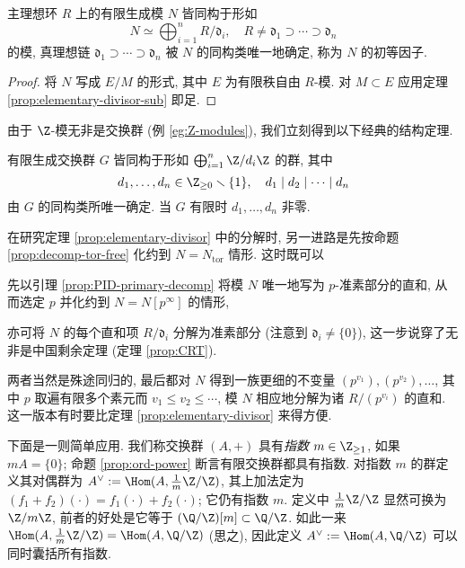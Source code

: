 \begin{theorem}\label{prop:elementary-divisor}
	主理想环 $R$ 上的有限生成模 $N$ 皆同构于形如
	\[ N \simeq \bigoplus_{i=1}^n R/\mathfrak{d}_i, \quad R \neq \mathfrak{d}_1 \supset \cdots \supset \mathfrak{d}_n \]
	的模, 真理想链 $\mathfrak{d}_1 \supset \cdots \supset \mathfrak{d}_n$ 被 $N$ 的同构类唯一地确定, 称为 $N$ 的初等因子.
\end{theorem}
\begin{proof}
	将 $N$ 写成 $E/M$ 的形式, 其中 $E$ 为有限秩自由 $R$-模. 对 $M \subset E$ 应用定理 \ref{prop:elementary-divisor-sub} 即足.
\end{proof}

由于 $\Z$-模无非是交换群 (例 \ref{eg:Z-modules}), 我们立刻得到以下经典的结构定理.
\begin{corollary}\label{prop:finite-abelian-structure}
	有限生成交换群 $G$ 皆同构于形如 $\bigoplus_{i=1}^n \Z/d_i\Z$ 的群, 其中
	\[ d_1, \ldots, d_n \in \Z_{\geq 0} \smallsetminus \{1\}, \quad d_1 \mid  d_2  \mid  \cdots  \mid  d_n \]
	由 $G$ 的同构类所唯一确定. 当 $G$ 有限时 $d_1, \ldots, d_n$ 非零.
\end{corollary}

\begin{remark}\label{rem:primary-elementary-divisor}
	在研究定理 \ref{prop:elementary-divisor} 中的分解时, 另一进路是先按命题 \ref{prop:decomp-tor-free} 化约到 $N = N_\text{tor}$ 情形. 这时既可以
	\begin{inparaenum}[(a)]
		\item 先以引理 \ref{prop:PID-primary-decomp} 将模 $N$ 唯一地写为 $p$-准素部分的直和, 从而选定 $p$ 并化约到 $N = N[p^\infty]$ 的情形,
		\item 亦可将 $N$ 的每个直和项 $R/\mathfrak{d}_i$ 分解为准素部分 (注意到 $\mathfrak{d}_i \neq \{0\}$), 这一步说穿了无非是中国剩余定理 (定理 \ref{prop:CRT}).
	\end{inparaenum}
	两者当然是殊途同归的, 最后都对 $N$ 得到一族更细的不变量 $(p^{v_1}), (p^{v_2}), \ldots$, 其中 $p$ 取遍有限多个素元而 $v_1 \leq v_2 \leq \cdots$, 模 $N$ 相应地分解为诸 $R/(p^{v_i})$ 的直和. 这一版本有时要比定理 \ref{prop:elementary-divisor} 来得方便.
\end{remark}

下面是一则简单应用. 我们称交换群 $(A,+)$ 具有\emph{指数} $m \in \Z_{\geq 1}$, 如果 $mA=\{0\}$; 命题 \ref{prop:ord-power} 断言有限交换群都具有指数. 对指数 $m$ 的群定义其对偶群为 $A^\vee := \Hom(A, \frac{1}{m}\Z/\Z)$, 其上加法定为 $(f_1 + f_2)(\cdot) = f_1(\cdot) + f_2(\cdot)$; 它仍有指数 $m$. 定义中 $\frac{1}{m}\Z/\Z$ 显然可换为 $\Z/m\Z$, 前者的好处是它等于 $(\Q/\Z)[m] \subset \Q/\Z$. 如此一来 $\Hom(A, \frac{1}{m}\Z/\Z) = \Hom(A, \Q/\Z)$ (思之), 因此定义 $A^\vee := \Hom(A, \Q/\Z)$ 可以同时囊括所有指数. 

